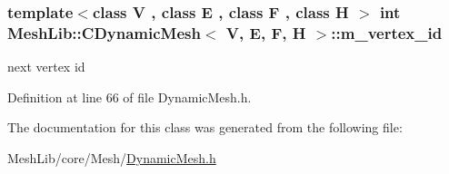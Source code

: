 \subsubsection[{\texorpdfstring{m\+\_\+vertex\+\_\+id}{m_vertex_id}}]{\setlength{\rightskip}{0pt plus 5cm}template$<$class V , class E , class F , class H $>$ int {\bf Mesh\+Lib\+::\+C\+Dynamic\+Mesh}$<$ V, E, F, H $>$\+::m\+\_\+vertex\+\_\+id\hspace{0.3cm}{\ttfamily [protected]}}\hypertarget{class_mesh_lib_1_1_c_dynamic_mesh_aeb1cf2cd71ab4f8845c3d5204a0ca93d}{}\label{class_mesh_lib_1_1_c_dynamic_mesh_aeb1cf2cd71ab4f8845c3d5204a0ca93d}
next vertex id 

Definition at line 66 of file Dynamic\+Mesh.\+h.



The documentation for this class was generated from the following file\+:\begin{DoxyCompactItemize}
\item 
Mesh\+Lib/core/\+Mesh/\hyperlink{_dynamic_mesh_8h}{Dynamic\+Mesh.\+h}\end{DoxyCompactItemize}
